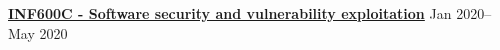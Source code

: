 \textbf{\href{http://info.uqam.ca/INF600X/}{INF600C - Software security and vulnerability exploitation} } \hfill Jan 2020--May 2020 \par
